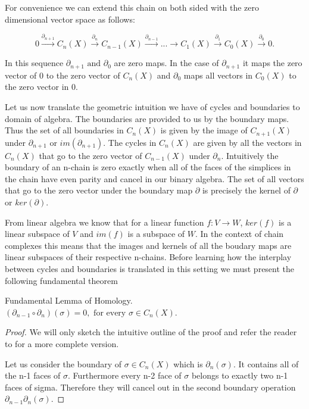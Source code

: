 For convenience we can extend this chain on both sided with the zero dimensional vector space as follows:

$$ 0 \overset{\partial_{n+1}}{\longrightarrow} C_n(X) \overset{\partial_{n}}{\longrightarrow} C_{n-1}(X) \overset{\partial_{n-1}}{\longrightarrow} ... \longrightarrow C_1(X) \overset{\partial_1}{\longrightarrow} C_0(X) \overset{\partial_0}{\longrightarrow} 0. $$

In this sequence $\partial_{n+1} \text{ and } \partial_{0}$ are zero maps. In the case of $\partial_{n+1}$ it maps the zero vector of $0$ to the zero vector of $C_n(X)$ and $\partial_0$ maps all vectors in $C_0(X)$ to the zero vector in $0$.

Let us now translate the geometric intuition we have of cycles and boundaries to domain of algebra. The boundaries are provided to us by the boundary maps. Thus the set of all boundaries in $C_n(X)$ is given by the image of $C_{n+1}(X)$ under $\partial_{n+1}$ or $im(\partial_{n+1})$. The cycles in $C_n(X)$ are given by all the vectors in $C_n(X)$ that go to the zero vector of $C_{n-1}(X)$ under $\partial_n$. Intuitively the boundary of an n-chain is zero exactly when all of the faces of the simplices in the chain have even parity and cancel in our binary algebra. The set of all vectors that go to the zero vector under the boundary map $\partial$ is precisely the kernel of $\partial$ or $ker(\partial)$.

From linear algebra we know that for a linear function $f: V \to W$, $ker(f)$ is a linear subspace of $V$ and $im(f)$ is a subspace of $W$. In the context of chain complexes this means that the images and kernels of all the boudary maps are linear subspaces of their respective n-chains. Before learning how the interplay between cycles and boundaries is translated in this setting we must present the following fundamental theorem

\begin{lem} Fundamental Lemma of Homology. $(\partial_{n-1} \circ \partial_n) (\sigma) = 0, \text{ for every } \sigma \in C_{n}(X)$. \end{lem}

\begin{proof}
    We will only sketch the intuitive outline of the proof and refer the reader to \cite{algebraic-topology} for a more complete version.

    Let us consider the boundary of $\sigma \in C_n(X)$ which is $\partial_n(\sigma)$. It contains all of the n-1 faces of $\sigma$. Furthermore every n-2 face of $\sigma$ belongs to exactly two n-1 faces of sigma. Therefore they will cancel out in the second boundary operation $\partial_{n-1}\partial_n(\sigma)$.
\end{proof}


